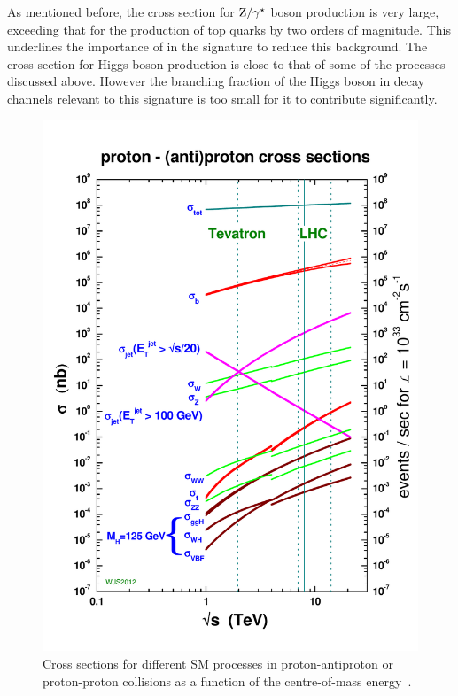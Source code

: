 As mentioned before, the cross section for $\mathrm{Z}/\gamma^{\star}$ boson production is very large, exceeding that for the production of top quarks by two orders of magnitude. This underlines the importance of \MET in the signature to reduce this background.
The cross section for Higgs boson production is close to that of some of the processes discussed above. However the branching fraction of the Higgs boson in decay channels relevant to this signature is too small for it to contribute significantly. 
\begin{figure}
\centering
\includegraphics[scale=0.3]{plots/THEO/crosssections2012_v5.pdf}
\caption{Cross sections for different SM processes in proton-antiproton or proton-proton collisions as a function of the centre-of-mass energy~\cite{sterling}.}
\label{fig:xsecs}
\end{figure}  